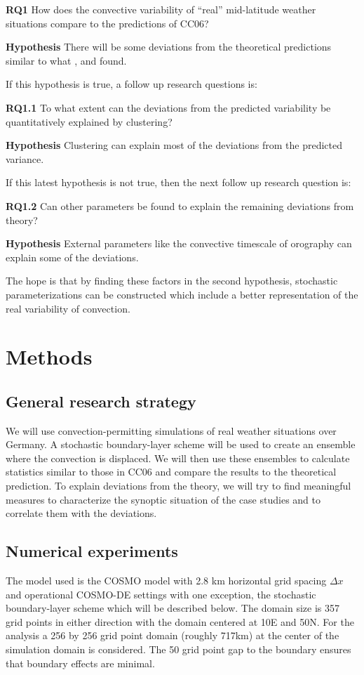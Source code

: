 \documentclass[a4paper, 12pt]{article}
\begin{document}
\textbf{RQ1} How does the convective variability of ``real'' mid-latitude weather situations compare to the predictions of CC06?

\textbf{Hypothesis} There will be some deviations from the theoretical predictions similar to what \cite{Cohen2006}, \cite{Davies2008} and \cite{Davoudi2010} found.

If this hypothesis is true, a follow up research questions is:

\textbf{RQ1.1} To what extent can the deviations from the predicted variability be quantitatively explained by clustering?

\textbf{Hypothesis} Clustering can explain most of the deviations from the predicted variance.

If this latest hypothesis is not true, then the next follow up research question is:

\textbf{RQ1.2} Can other parameters be found to explain the remaining deviations from theory?

\textbf{Hypothesis} External parameters like the convective timescale of orography can explain some of the deviations.

The hope is that by finding these factors in the second hypothesis, stochastic parameterizations can be constructed which include a better representation of the real variability of convection. 

\section{Methods}

\subsection{General research strategy}
We will use convection-permitting simulations of real weather situations over Germany. A stochastic boundary-layer scheme will be used to create an ensemble where the convection is displaced. We will then use these ensembles to calculate statistics similar to those in CC06 and compare the results to the theoretical prediction. To explain deviations from the theory, we will try to find meaningful measures to characterize the synoptic situation of the case studies and to correlate them with the deviations.  

\subsection{Numerical experiments}
The model used is the COSMO model with 2.8 km horizontal grid spacing $\Delta x$ and operational COSMO-DE settings with one exception, the stochastic boundary-layer scheme which will be described below. The domain size is 357 grid points in either direction with the domain centered at 10E and 50N. For the analysis a 256 by 256 grid point domain (roughly 717km) at the center of the simulation domain is considered. The 50 grid point gap to the boundary ensures that boundary effects are minimal. 
\end{document}
